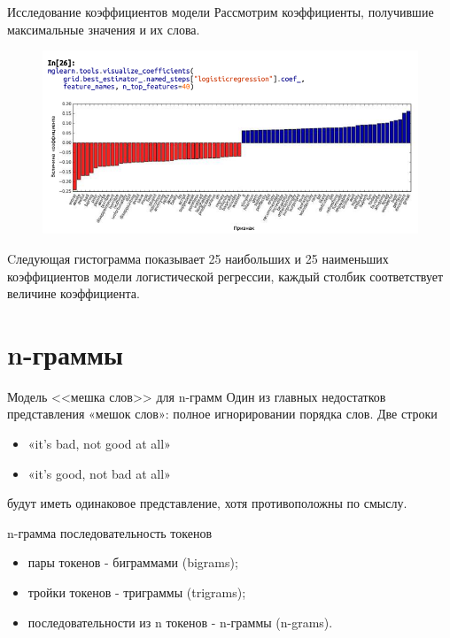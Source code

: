 \documentclass{beamer}
\begin{document}
\begin{frame}{Исследование коэффициентов модели}
Рассмотрим коэффициенты, получившие максимальные значения и их слова. 
\begin{figure}[h]
\centering
\includegraphics[scale=0.5]{images/lec09-pic26.png}
\end{figure}
Cледующая гистограмма показывает 25 наибольших и 25 наименьших коэффициентов модели логистической регрессии, каждый столбик соответствует величине коэффициента.
\end{frame}

\section{n-граммы}

\begin{frame}{Модель <<мешка слов>> для n-грамм}
Один из главных недостатков представления «мешок слов»: полное игнорировании порядка слов. Две строки   
\begin{itemize}
\item «it’s bad, not good at all» 
\item «it’s good, not bad at all» 
\end{itemize}
будут иметь одинаковое представление, хотя противоположны по смыслу.
\begin{block}{n-грамма}
последовательность токенов
\end{block}
\begin{itemize}
\item пары токенов - биграммами (bigrams);
\item тройки токенов - триграммы (trigrams);
\item последовательности из n токенов - n-граммы (n-grams). 
\end{itemize}
\end{frame}
\end{document}
